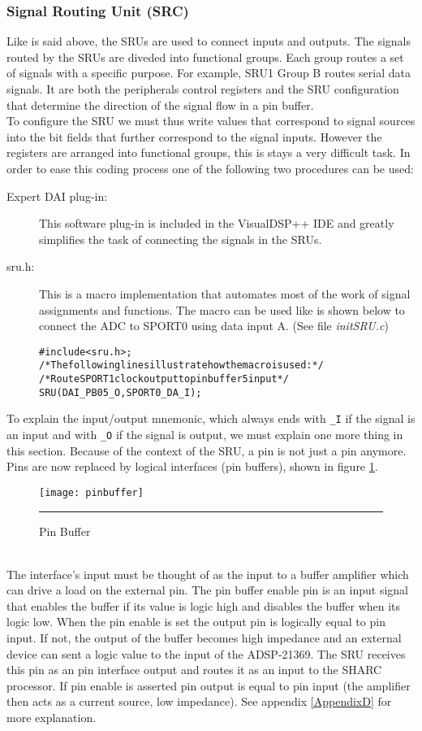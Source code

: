 \subsubsection{Signal Routing Unit (SRC)}
Like is said above, the SRUs are used to connect inputs and outputs. The signals routed by the SRUs are diveded into functional groups. Each group routes a set of signals with a specific purpose. For example, SRU1 Group B routes serial data signals.  It are both the peripherals control registers and the SRU configuration that determine the direction of the signal flow in a pin buffer. \\ To configure the SRU we must thus write values that correspond to signal sources into the bit fields that further correspond to the signal inputs. However the registers are arranged into functional groups, this is stays a very difficult task. In order to ease this coding process one of the following two procedures can be used:
\begin{description}
\item[Expert DAI plug-in:] This software plug-in is included in the VisualDSP++ IDE and greatly simplifies the task of connecting the signals in the SRUs.
\item[sru.h:] This is a macro implementation that automates most of the work of signal assignments and functions. The macro can be used like is shown below to connect the ADC to SPORT0 using data input A. (See file \emph{initSRU.c})
\begin{alltt}
#include <sru.h>;
/* The following lines illustrate how the macro is used: */
/* Route SPORT 1 clock output to pin buffer 5 input */
\hspace{1cm}	SRU(DAI_PB05_O,SPORT0_DA_I);
\end{alltt}
\end{description}
To explain the input/output mnemonic, which always ends with \verb+_I+ if the signal is an input and with \verb+_O+ if the signal is output, we must explain one more thing in this section. Because of the context of the SRU, a pin is not just a pin anymore. Pins are now replaced by logical interfaces (pin buffers), shown in figure \ref{fig:pinbuffer}.
\begin{figure}[htbp]
\centering
\texttt{[image: pinbuffer]}
\rule{30em}{0.5pt}
\caption{Pin Buffer}
\label{fig:pinbuffer}
\end{figure}\\
The interface's input must be thought of as the input to a buffer amplifier which can drive a load on the external pin. The pin buffer enable pin is an input signal that enables the buffer if its value is logic high and disables the buffer when its logic low. When the pin enable is set the output pin is logically equal to pin input. If not, the output of the buffer becomes high impedance and an external device can sent a logic value to the input of the ADSP-21369. The SRU receives this pin as an pin interface output and routes it as an input to the SHARC processor. If pin enable is asserted pin output is equal to pin input (the amplifier then acts as a current source, low impedance). See appendix \ref{AppendixD} for more explanation.
